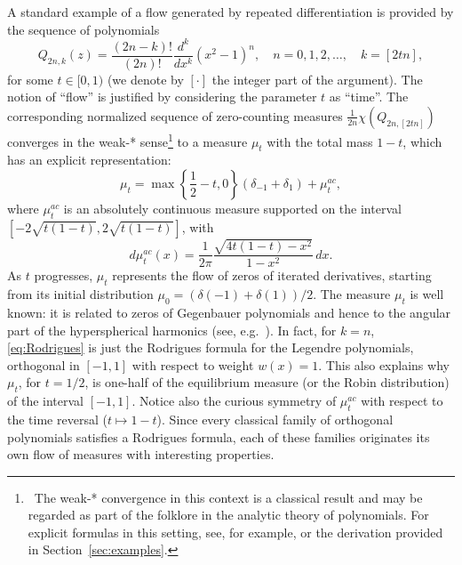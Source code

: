 \documentclass[reqno,11pt]{amsart}
\theoremstyle{plain}
\theoremstyle{definition}
\theoremstyle{remark}
\numberwithin{equation}{section}
\numberwithin{equation}{section}
\begin{document}
A standard example of a flow generated by repeated differentiation is provided by the sequence of polynomials
\begin{equation} \label{eq:Rodrigues}
	Q_{2n,k} (z)=\frac{(2n-k)!}{(2n)!}\frac{d^k}{d x^k}\left(x^2-1\right)^n, \quad n=0,1,2,\dots, \quad k=[2 t n], 
\end{equation}
for some $t \in[0,1)$ (we denote by $[\cdot]$ the integer part of the argument). The notion of ``flow'' is justified by considering the parameter $t$ as ``time''.
The corresponding  normalized sequence of zero-counting measures
$\frac{1}{2 n} \chi\left(Q_{2n, [2tn] }\right) $  converges in the weak-* sense\footnote{\, The weak-* convergence in this context is a classical result and may be regarded as part of the folklore in the analytic theory of polynomials. For explicit formulas in this setting, see, for example, \cite{ShapiroRodrigues, HoskinsKabluchko21} or the derivation provided in Section~\ref{sec:examples}.} to a measure $\mu_t$ with the total mass $1-t$, which has an explicit representation:
\begin{equation}
    \label{example1a}
\mu_t = \max \left\{ \frac{1}{2}-t, 0\right\} \left(\delta_{-1}+\delta_1\right)+  \mu_t^{ac} , 
\end{equation}
where $\mu_t^{ac} $ is an absolutely continuous measure supported on the interval $[-2 \sqrt{t(1-t)}, 2 \sqrt{t(1-t)}]$, with
\begin{equation}
    \label{example1b}
d\mu_t^{ac}  (x)= \frac{1}{2 \pi} \frac{\sqrt{4 t(1-t)-x^2}}{1-x^2}\, d x. 
\end{equation}
As $t$ progresses, $\mu_t$ represents the flow of zeros of iterated derivatives, starting from its initial distribution $\mu_0=(\delta(-1)+\delta(1))/2$. 
The measure $\mu_t$ is well known: it is related to zeros of Gegenbauer polynomials and hence to the angular part of the hyperspherical harmonics (see, e.g.~\cite[Examples IV.1.18 and IV.6.2]{SaTo}). In fact, for $k=n$, \eqref{eq:Rodrigues} is just the Rodrigues formula for the Legendre polynomials, orthogonal in $[-1,1]$ with respect to weight $w(x)=1$. This also explains why $\mu_t$, for $t=1/2$, is one-half of the equilibrium measure (or the Robin distribution) of the interval $[-1,1]$. Notice also the curious symmetry of $\mu_t^{ac} $ with respect to the time reversal ($t\mapsto 1-t$).  Since every classical family of orthogonal polynomials satisfies a Rodrigues formula, each of these families originates its own flow of measures with interesting properties.
 
\end{document}
